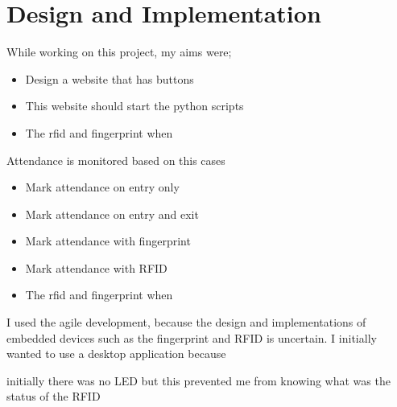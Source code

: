 \chapter{Design and Implementation}

While working on this project, my aims were;
\begin{itemize}
  \item Design a website that has buttons
  \item This website should start the python scripts
  \item The rfid and fingerprint when 
\end{itemize}
Attendance is monitored based on this cases
\begin{itemize}
  \item Mark attendance on entry only 
  \item Mark attendance on entry and exit 
  \item Mark attendance with fingerprint
  \item Mark attendance with RFID
  \item The rfid and fingerprint when 
\end{itemize}

I used the agile development, because the design and implementations of embedded devices such as the fingerprint and RFID is uncertain. I initially wanted to use a desktop application because 


initially there was no LED but this prevented me from knowing what was the status of the RFID 
